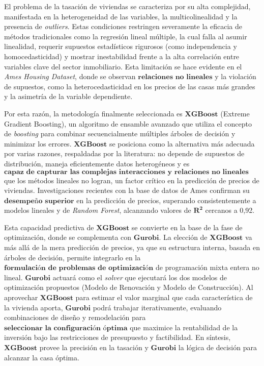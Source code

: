 El problema de la tasación de viviendas se caracteriza por su alta complejidad, manifestada en la heterogeneidad de las variables, la multicolinealidad y la presencia de \textit{outliers}. Estas condiciones restringen severamente la eficacia de métodos tradicionales como la regresión lineal múltiple, la cual falla al asumir linealidad, requerir supuestos estadísticos rigurosos (como independencia y homocedasticidad) y mostrar inestabilidad frente a la alta correlación entre variables clave del sector inmobiliario. Esta limitación se hace evidente en el \textit{Ames Housing Dataset}, donde se observan $\mathbf{\text{relaciones no lineales}}$ y la violación de supuestos, como la heterocedasticidad en los precios de las casas más grandes y la asimetría de la variable dependiente.

Por esta razón, la metodología finalmente seleccionada es $\mathbf{XGBoost}$ (Extreme  Gradient  Boosting), un algoritmo de ensamble avanzado que utiliza el concepto de \textit{boosting} para combinar secuencialmente múltiples árboles de decisión y minimizar los errores. $\mathbf{XGBoost}$ se posiciona como la alternativa más adecuada por varias razones, respaldadas por la literatura: no depende de supuestos de distribución, maneja eficientemente datos heterogéneos y es $\mathbf{\text{capaz de capturar las complejas interacciones y relaciones no lineales}}$ que los métodos lineales no logran, un factor crítico en la predicción de precios de viviendas. Investigaciones recientes con la base de datos de Ames confirman su $\mathbf{\text{desempeño superior}}$ en la predicción de precios, superando consistentemente a modelos lineales y de \textit{Random Forest}, alcanzando valores de $\mathbf{R^2}$ cercanos a 0,92.

Esta capacidad predictiva de $\mathbf{XGBoost}$ se convierte en la base de la fase de optimización, donde se complementa con $\mathbf{Gurobi}$. La elección de $\mathbf{XGBoost}$ va más allá de la mera predicción de precios, ya que su estructura interna, basada en árboles de decisión, permite integrarlo en la $\mathbf{\text{formulación de problemas de optimización}}$ de programación mixta entera no lineal. $\mathbf{Gurobi}$ actuará como el \textit{solver} que ejecutará los dos modelos de optimización propuestos (Modelo de Renovación y Modelo de Construcción). Al aprovechar $\mathbf{XGBoost}$ para estimar el valor marginal que cada característica de la vivienda aporta, $\mathbf{Gurobi}$ podrá trabajar iterativamente, evaluando combinaciones de diseño y remodelación para $\mathbf{\text{seleccionar la configuración óptima}}$ que maximice la rentabilidad de la inversión bajo las restricciones de presupuesto y factibilidad. En síntesis, $\mathbf{XGBoost}$ provee la precisión en la tasación y $\mathbf{Gurobi}$ la lógica de decisión para alcanzar la casa óptima.

